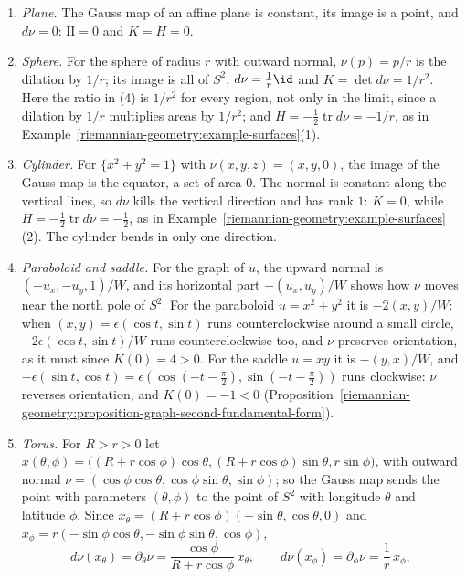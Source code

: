 \begin{example}\label{riemannian-geometry:example-gauss-map}
\begin{enumerate}
\item \emph{Plane.} The Gauss map of an affine plane is constant, its image is a point, and $d\nu = 0$: $\mathrm{II} = 0$ and $K = H = 0$.
\item \emph{Sphere.} For the sphere of radius $r$ with outward normal, $\nu(p) = p/r$ is the dilation by $1/r$; its image is all of $S^2$, $d\nu = \frac1r\id$ and $K = \det d\nu = 1/r^2$. Here the ratio in
(4) is $1/r^2$ for every region, not only in the limit, since a dilation by $1/r$ multiplies areas by $1/r^2$; and $H = -\frac12\operatorname{tr}d\nu = -1/r$, as in Example~\ref{riemannian-geometry:example-surfaces}(1).
\item \emph{Cylinder.} For $\{x^2 + y^2 = 1\}$ with $\nu(x, y, z) = (x, y, 0)$, the image of the Gauss map is the equator, a set of area $0$. The normal is constant along the vertical lines, so $d\nu$ kills
the vertical direction and has rank $1$: $K = 0$, while $H = -\frac12\operatorname{tr}d\nu = -\frac12$, as in Example~\ref{riemannian-geometry:example-surfaces}(2). The cylinder bends in only one direction.
\item \emph{Paraboloid and saddle.} For the graph of $u$, the upward normal is $(-u_x, -u_y, 1)/W$, and its horizontal part $-(u_x, u_y)/W$ shows how $\nu$ moves near the north pole of $S^2$. For the
paraboloid $u = x^2 + y^2$ it is $-2(x, y)/W$: when $(x, y) = \epsilon(\cos t, \sin t)$ runs counterclockwise around a small circle, $-2\epsilon(\cos t, \sin t)/W$ runs counterclockwise too, and $\nu$
preserves orientation, as it must since $K(0) = 4 > 0$. For the saddle $u = xy$ it is $-(y, x)/W$, and $-\epsilon(\sin t, \cos t) = \epsilon(\cos(-t - \frac\pi2), \sin(-t - \frac\pi2))$ runs clockwise: $\nu$
reverses orientation, and $K(0) = -1 < 0$ (Proposition~\ref{riemannian-geometry:proposition-graph-second-fundamental-form}).
\item \emph{Torus.} For $R > r > 0$ let $x(\theta, \phi) = \bigl((R + r\cos\phi)\cos\theta, (R + r\cos\phi)\sin\theta, r\sin\phi\bigr)$, with outward normal
$\nu = (\cos\phi\cos\theta, \cos\phi\sin\theta, \sin\phi)$; so the Gauss map sends the point with parameters $(\theta, \phi)$ to the point of $S^2$ with longitude $\theta$ and latitude $\phi$. Since
$x_\theta = (R + r\cos\phi)(-\sin\theta, \cos\theta, 0)$ and $x_\phi = r(-\sin\phi\cos\theta, -\sin\phi\sin\theta, \cos\phi)$,
\[
d\nu(x_\theta) = \partial_\theta\nu = \frac{\cos\phi}{R + r\cos\phi}\,x_\theta, \qquad d\nu(x_\phi) = \partial_\phi\nu = \frac1r\,x_\phi ,
\]
\end{enumerate}
\end{example}
